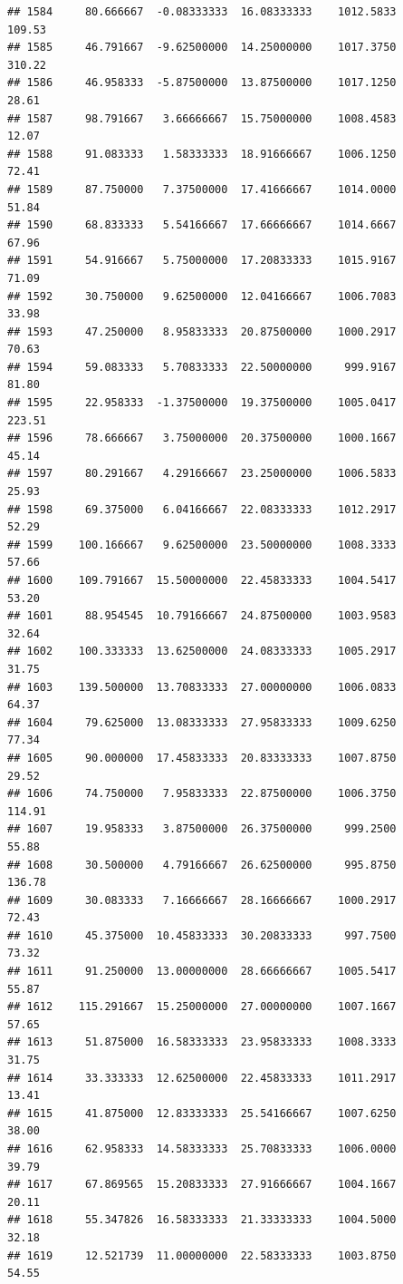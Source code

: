 \documentclass[
]{article}
\begin{document}
\begin{verbatim}
## 1584     80.666667  -0.08333333  16.08333333    1012.5833      109.53
## 1585     46.791667  -9.62500000  14.25000000    1017.3750      310.22
## 1586     46.958333  -5.87500000  13.87500000    1017.1250       28.61
## 1587     98.791667   3.66666667  15.75000000    1008.4583       12.07
## 1588     91.083333   1.58333333  18.91666667    1006.1250       72.41
## 1589     87.750000   7.37500000  17.41666667    1014.0000       51.84
## 1590     68.833333   5.54166667  17.66666667    1014.6667       67.96
## 1591     54.916667   5.75000000  17.20833333    1015.9167       71.09
## 1592     30.750000   9.62500000  12.04166667    1006.7083       33.98
## 1593     47.250000   8.95833333  20.87500000    1000.2917       70.63
## 1594     59.083333   5.70833333  22.50000000     999.9167       81.80
## 1595     22.958333  -1.37500000  19.37500000    1005.0417      223.51
## 1596     78.666667   3.75000000  20.37500000    1000.1667       45.14
## 1597     80.291667   4.29166667  23.25000000    1006.5833       25.93
## 1598     69.375000   6.04166667  22.08333333    1012.2917       52.29
## 1599    100.166667   9.62500000  23.50000000    1008.3333       57.66
## 1600    109.791667  15.50000000  22.45833333    1004.5417       53.20
## 1601     88.954545  10.79166667  24.87500000    1003.9583       32.64
## 1602    100.333333  13.62500000  24.08333333    1005.2917       31.75
## 1603    139.500000  13.70833333  27.00000000    1006.0833       64.37
## 1604     79.625000  13.08333333  27.95833333    1009.6250       77.34
## 1605     90.000000  17.45833333  20.83333333    1007.8750       29.52
## 1606     74.750000   7.95833333  22.87500000    1006.3750      114.91
## 1607     19.958333   3.87500000  26.37500000     999.2500       55.88
## 1608     30.500000   4.79166667  26.62500000     995.8750      136.78
## 1609     30.083333   7.16666667  28.16666667    1000.2917       72.43
## 1610     45.375000  10.45833333  30.20833333     997.7500       73.32
## 1611     91.250000  13.00000000  28.66666667    1005.5417       55.87
## 1612    115.291667  15.25000000  27.00000000    1007.1667       57.65
## 1613     51.875000  16.58333333  23.95833333    1008.3333       31.75
## 1614     33.333333  12.62500000  22.45833333    1011.2917       13.41
## 1615     41.875000  12.83333333  25.54166667    1007.6250       38.00
## 1616     62.958333  14.58333333  25.70833333    1006.0000       39.79
## 1617     67.869565  15.20833333  27.91666667    1004.1667       20.11
## 1618     55.347826  16.58333333  21.33333333    1004.5000       32.18
## 1619     12.521739  11.00000000  22.58333333    1003.8750       54.55

\end{verbatim}
\end{document}
